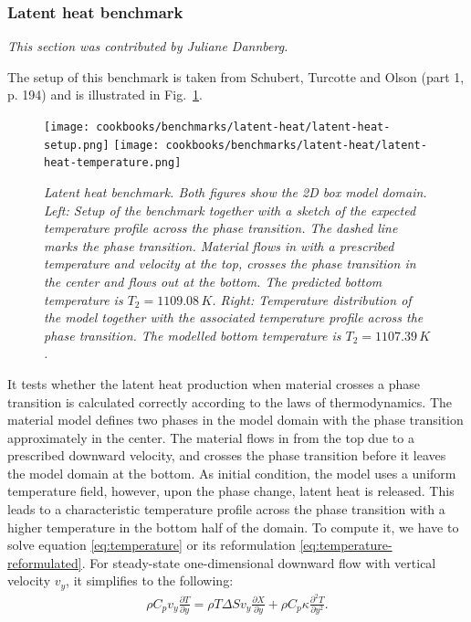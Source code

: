 \documentclass{article}
\begin{document}
\subsubsection{Latent heat benchmark}
\label{sec:benchmark-latent_heat}

\textit{This section was contributed by Juliane Dannberg.}

The setup of this benchmark is taken from Schubert, Turcotte and Olson \cite{STO01} (part 1, p. 194) and is illustrated in Fig.~\ref{fig:latent-heat-benchmark}.
\begin{figure}
  \begin{center}
    \texttt{[image: cookbooks/benchmarks/latent-heat/latent-heat-setup.png]}
    \hfill
    \texttt{[image: cookbooks/benchmarks/latent-heat/latent-heat-temperature.png]}
  \end{center}
  \caption{\it Latent heat benchmark. Both figures show the 2D box model domain.
      Left: Setup of the benchmark together with a sketch of the expected
      temperature profile across the phase transition. The dashed line marks
      the phase transition. Material flows in with a prescribed temperature and
      velocity at the top, crosses the phase transition in the center and flows
      out at the bottom. The predicted bottom temperature is $T_2 = 1109.08 \, \si{K}$.
      Right: Temperature distribution of the model together with the associated
      temperature profile across the phase transition. The modelled bottom
      temperature is $T_2 = 1107.39 \, \si{K}$.}
  \label{fig:latent-heat-benchmark}
\end{figure}
It tests whether the latent heat production when material crosses a phase
transition is calculated correctly according to the laws of thermodynamics. The material
model defines two phases in the model domain with the phase transition
approximately in the center. The material flows in from the top due to a
prescribed downward velocity, and crosses the phase transition before it leaves
the model domain at the bottom. As initial condition, the model uses a uniform
temperature field, however, upon the phase change, latent heat is released. This
leads to a characteristic temperature profile across the phase transition with a
higher temperature in the bottom half of the domain. To compute it, we have to solve 
equation \eqref{eq:temperature} or its reformulation
\eqref{eq:temperature-reformulated}. For
steady-state one-dimensional downward flow with vertical velocity $v_y$, it
simplifies to the following:
\begin{gather*}
\rho C_p
v_y
\frac{\partial T}{\partial y} = 
\rho T \Delta S v_y \frac{\partial X}{\partial y} 
+ \rho C_p \kappa
\frac{\partial^2 T}{\partial y^2}.
\end{gather*}
\end{document}
